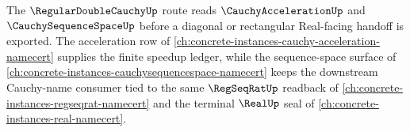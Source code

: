 The $\RegularDoubleCauchyUp$ route reads $\CauchyAccelerationUp$ and $\CauchySequenceSpaceUp$ before a diagonal or rectangular Real-facing handoff is exported. The acceleration row of \autoref{ch:concrete-instances-cauchy-acceleration-namecert} supplies the finite speedup ledger, while the sequence-space surface of \autoref{ch:concrete-instances-cauchysequencespace-namecert} keeps the downstream Cauchy-name consumer tied to the same $\RegSeqRatUp$ readback of \autoref{ch:concrete-instances-regseqrat-namecert} and the terminal $\RealUp$ seal of \autoref{ch:concrete-instances-real-namecert}.
